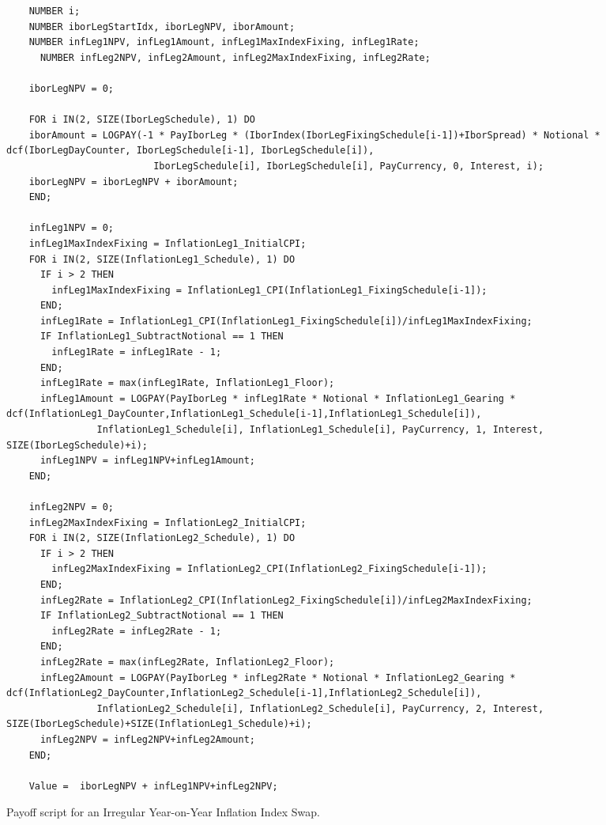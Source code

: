 \begin{listing}[hbt]
  \begin{verbatim}
    NUMBER i;
    NUMBER iborLegStartIdx, iborLegNPV, iborAmount;
    NUMBER infLeg1NPV, infLeg1Amount, infLeg1MaxIndexFixing, infLeg1Rate;
      NUMBER infLeg2NPV, infLeg2Amount, infLeg2MaxIndexFixing, infLeg2Rate;

    iborLegNPV = 0;

    FOR i IN(2, SIZE(IborLegSchedule), 1) DO
    iborAmount = LOGPAY(-1 * PayIborLeg * (IborIndex(IborLegFixingSchedule[i-1])+IborSpread) * Notional * dcf(IborLegDayCounter, IborLegSchedule[i-1], IborLegSchedule[i]),
                          IborLegSchedule[i], IborLegSchedule[i], PayCurrency, 0, Interest, i);
    iborLegNPV = iborLegNPV + iborAmount;
    END;

    infLeg1NPV = 0;
    infLeg1MaxIndexFixing = InflationLeg1_InitialCPI;
    FOR i IN(2, SIZE(InflationLeg1_Schedule), 1) DO
      IF i > 2 THEN
        infLeg1MaxIndexFixing = InflationLeg1_CPI(InflationLeg1_FixingSchedule[i-1]);
      END;
      infLeg1Rate = InflationLeg1_CPI(InflationLeg1_FixingSchedule[i])/infLeg1MaxIndexFixing;
      IF InflationLeg1_SubtractNotional == 1 THEN
        infLeg1Rate = infLeg1Rate - 1;
      END;
      infLeg1Rate = max(infLeg1Rate, InflationLeg1_Floor);
      infLeg1Amount = LOGPAY(PayIborLeg * infLeg1Rate * Notional * InflationLeg1_Gearing * dcf(InflationLeg1_DayCounter,InflationLeg1_Schedule[i-1],InflationLeg1_Schedule[i]),
                InflationLeg1_Schedule[i], InflationLeg1_Schedule[i], PayCurrency, 1, Interest, SIZE(IborLegSchedule)+i);
      infLeg1NPV = infLeg1NPV+infLeg1Amount;
    END;

    infLeg2NPV = 0;
    infLeg2MaxIndexFixing = InflationLeg2_InitialCPI;
    FOR i IN(2, SIZE(InflationLeg2_Schedule), 1) DO
      IF i > 2 THEN
        infLeg2MaxIndexFixing = InflationLeg2_CPI(InflationLeg2_FixingSchedule[i-1]);
      END;
      infLeg2Rate = InflationLeg2_CPI(InflationLeg2_FixingSchedule[i])/infLeg2MaxIndexFixing;
      IF InflationLeg2_SubtractNotional == 1 THEN
        infLeg2Rate = infLeg2Rate - 1;
      END;
      infLeg2Rate = max(infLeg2Rate, InflationLeg2_Floor);
      infLeg2Amount = LOGPAY(PayIborLeg * infLeg2Rate * Notional * InflationLeg2_Gearing * dcf(InflationLeg2_DayCounter,InflationLeg2_Schedule[i-1],InflationLeg2_Schedule[i]),
                InflationLeg2_Schedule[i], InflationLeg2_Schedule[i], PayCurrency, 2, Interest, SIZE(IborLegSchedule)+SIZE(InflationLeg1_Schedule)+i);
      infLeg2NPV = infLeg2NPV+infLeg2Amount;
    END;

    Value =  iborLegNPV + infLeg1NPV+infLeg2NPV;
\end{verbatim}
  \caption{Payoff script for an Irregular Year-on-Year Inflation Index Swap.}
  \label{lst:irregularYYIIS}
\end{listing}

